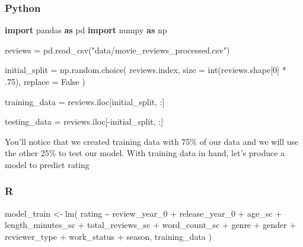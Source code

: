 \documentclass[
  letterpaper,
]{krantz}
\newenvironment{Shaded}{}{}
\newcommand{\BuiltInTok}[1]{\textcolor[rgb]{0.00,0.50,0.00}{#1}}
\newcommand{\DecValTok}[1]{\textcolor[rgb]{0.25,0.63,0.44}{#1}}
\newcommand{\FloatTok}[1]{\textcolor[rgb]{0.25,0.63,0.44}{#1}}
\newcommand{\FunctionTok}[1]{\textcolor[rgb]{0.02,0.16,0.49}{#1}}
\newcommand{\ImportTok}[1]{\textcolor[rgb]{0.00,0.50,0.00}{\textbf{#1}}}
\newcommand{\NormalTok}[1]{#1}
\newcommand{\OperatorTok}[1]{\textcolor[rgb]{0.40,0.40,0.40}{#1}}
\newcommand{\OtherTok}[1]{\textcolor[rgb]{0.00,0.44,0.13}{#1}}
\newcommand{\SpecialCharTok}[1]{\textcolor[rgb]{0.25,0.44,0.63}{#1}}
\newcommand{\StringTok}[1]{\textcolor[rgb]{0.25,0.44,0.63}{#1}}
\newcommand{\VariableTok}[1]{\textcolor[rgb]{0.10,0.09,0.49}{#1}}
\begin{document}
\subsubsection{Python}

\begin{Shaded}
\begin{Highlighting}[]
\ImportTok{import}\NormalTok{ pandas }\ImportTok{as}\NormalTok{ pd}
\ImportTok{import}\NormalTok{ numpy }\ImportTok{as}\NormalTok{ np}

\NormalTok{reviews }\OperatorTok{=}\NormalTok{ pd.read\_csv(}\StringTok{"data/movie\_reviews\_processed.csv"}\NormalTok{)}

\NormalTok{initial\_split }\OperatorTok{=}\NormalTok{ np.random.choice(}
\NormalTok{    reviews.index, }
\NormalTok{    size }\OperatorTok{=} \BuiltInTok{int}\NormalTok{(reviews.shape[}\DecValTok{0}\NormalTok{] }\OperatorTok{*} \FloatTok{.75}\NormalTok{), }
\NormalTok{    replace }\OperatorTok{=} \VariableTok{False}
\NormalTok{)}

\NormalTok{training\_data }\OperatorTok{=}\NormalTok{ reviews.iloc[initial\_split, :]}

\NormalTok{testing\_data }\OperatorTok{=}\NormalTok{ reviews.iloc[}\OperatorTok{{-}}\NormalTok{initial\_split, :]}
\end{Highlighting}
\end{Shaded}

You'll notice that we created training data with 75\% of our data and we
will use the other 25\% to test our model. With training data in hand,
let's produce a model to predict rating

\subsubsection{R}

\begin{Shaded}
\begin{Highlighting}[]
\NormalTok{model\_train }\OtherTok{\textless{}{-}} \FunctionTok{lm}\NormalTok{(}
\NormalTok{  rating }\SpecialCharTok{\textasciitilde{}} 
\NormalTok{    review\_year\_0 }\SpecialCharTok{+}\NormalTok{ release\_year\_0 }\SpecialCharTok{+} 
\NormalTok{    age\_sc }\SpecialCharTok{+}\NormalTok{ length\_minutes\_sc }\SpecialCharTok{+} 
\NormalTok{    total\_reviews\_sc }\SpecialCharTok{+}\NormalTok{ word\_count\_sc }\SpecialCharTok{+}
\NormalTok{    genre }\SpecialCharTok{+}\NormalTok{ gender }\SpecialCharTok{+}
\NormalTok{    reviewer\_type }\SpecialCharTok{+}\NormalTok{ work\_status }\SpecialCharTok{+}
\NormalTok{    season, }
\NormalTok{  training\_data}
\NormalTok{)}
\end{Highlighting}
\end{Shaded}
\end{document}
